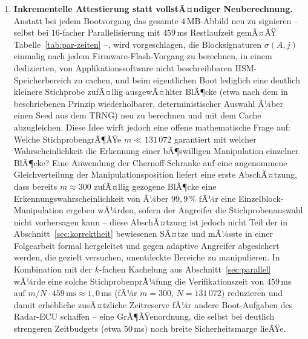 ﻿\documentclass[a4paper,12pt]{article}
\theoremstyle{definition}
\begin{document}
\begin{enumerate}
	\item \textbf{Inkrementelle Attestierung statt vollstÃ¤ndiger Neuberechnung.} Anstatt bei jedem Bootvorgang das gesamte $4$\,MB-Abbild neu zu signieren -- selbst bei $16$-facher Parallelisierung mit $459$\,ms Restlaufzeit gemÃ¤ÃŸ Tabelle~\ref{tab:par-zeiten} --, wird vorgeschlagen, die Blocksignaturen $\sigma(A,j)$ einmalig nach jedem Firmware-Flash-Vorgang zu berechnen, in einem dedizierten, von Applikationssoftware nicht beschreibbaren HSM-Speicherbereich zu cachen, und beim eigentlichen Boot lediglich eine deutlich kleinere Stichprobe zufÃ¤llig ausgewÃ¤hlter BlÃ¶cke (etwa nach dem in \cite{Epp26a} beschriebenen Prinzip wiederholbarer, deterministischer Auswahl Ã¼ber einen Seed aus dem TRNG) neu zu berechnen und mit dem Cache abzugleichen. Diese Idee wirft jedoch eine offene mathematische Frage auf: Welche StichprobengrÃ¶ÃŸe $m \ll 131\,072$ garantiert mit welcher Wahrscheinlichkeit die Erkennung einer bÃ¶swilligen Manipulation einzelner BlÃ¶cke? Eine Anwendung der Chernoff-Schranke auf eine angenommene Gleichverteilung der Manipulationsposition liefert eine erste AbschÃ¤tzung, dass bereits $m \approx 300$ zufÃ¤llig gezogene BlÃ¶cke eine Erkennungswahrscheinlichkeit von Ã¼ber $99{,}9\,\%$ fÃ¼r eine Einzelblock-Manipulation ergeben wÃ¼rden, sofern der Angreifer die Stichprobenauswahl nicht vorhersagen kann -- diese AbschÃ¤tzung ist jedoch nicht Teil der in Abschnitt~\ref{sec:korrektheit} bewiesenen SÃ¤tze und mÃ¼sste in einer Folgearbeit formal hergeleitet und gegen adaptive Angreifer abgesichert werden, die gezielt versuchen, unentdeckte Bereiche zu manipulieren. In Kombination mit der $k$-fachen Kachelung aus Abschnitt~\ref{sec:parallel} wÃ¼rde eine solche StichprobenprÃ¼fung die Verifikationszeit von $459$\,ms auf $m/N \cdot 459\,\mathrm{ms} \approx 1{,}0$\,ms (fÃ¼r $m=300$, $N=131\,072$) reduzieren und damit erhebliche zusÃ¤tzliche Zeitreserve fÃ¼r andere Boot-Aufgaben des Radar-ECU schaffen -- eine GrÃ¶ÃŸenordnung, die selbst bei deutlich strengeren Zeitbudgets (etwa $50$\,ms) noch breite Sicherheitsmarge lieÃŸe.

\end{enumerate}
\end{document}
